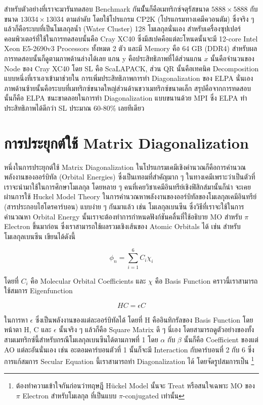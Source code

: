สำหรับตัวอย่างที่เราจะมารันทดสอบ Benchmark กันนัั้นก็คือเมทริกซ์จตุรัสขนาด $5888 \times 5888$ กับขนาด $13034 \times 13034$
ตามลำดับ โดยใช้โปรแกรม CP2K (โปรแกรมทางเคมีควอนตัม) ซึ่งจริง ๆ แล้วก็คือระบบที่เป็นโมเลกุลน้ำ (Water Cluster) 128 โมเลกุลนั่นเอง
สำหรับเครื่องซุปเปอร์คอมพิวเตอร์ที่ใช้ในการทดสอบนั้นคือ Cray XC40 ซึ่งมีสเปคคือแต่ละโหนดนั้นจะมี 12-core Intel Xeon E5-2690v3 Processors
ทั้งหมด 2 ตัว และมี Memory คือ 64 GB (DDR4) สำหรับผลการทดสอบนั้นก็ดูตามภาพด้านล่างได้เลย แกน y คือประสิทธิภาพที่ได้ส่วนแกน $x$
นั้นคือจำนวนของ Node ของ Cray XC40 โดย SL คือ ScaLAPACK, ส่วน QR นั้นคือเทคนิค Decomposition แบบหนึ่งที่เราเอาเข้ามาช่วยใน%
การเพิ่มประสิทธิภาพการทำ Diagonalization ของ ELPA นั่นเอง ภาพด้านซ้ายนั้นคือระบบที่เมทริกซ์ขนาดใหญ่ส่วนด้านขวาเมทริกซ์ขนาดเล็ก
สรุปคือจากการทดสอบนั้นก็คือ ELPA ชนะขาดลอยในการทำ Diagonalization แบบขนานด้วย MPI ซึ่ง ELPA ทำประสิทธิภาพได้ดีกว่า SL
ประมาณ 60-80\% เลยทีเดียว

\section{การประยุกต์ใช้ Matrix Diagonalization}

หนึ่งในการประยุกต์ใช้ Matrix Diagonalization ในโปรแกรมเคมีเชิงคำนวณก็คือการคำนวณพลังงานของออร์บิทัล (Orbital Energies)
ซึ่งเป็นเทอมที่สำคัญมาก ๆ ในทางเคมีเพราะว่าเป็นตัวที่เราจะนำมาใช้ในการศึกษาโมเลกุล โดยหลาย ๆ คนที่เคยวิชาเคมีอินทรีย์เชิงฟิสิกส์มานั้นก็น่า%
จะเคยผ่านการใช้ Huckel Model Theory ในการคำนวณหาพลังงานของออร์บิทัลของโมเลกุลเคมีอินทรีย์ (สารประกอบไฮโดรคาร์บอน) แบบง่าย ๆ
กันมาแล้ว เช่น โมเลกุลเบนซีน ซึ่งวิธีที่เราจะใช้ในการคำนวณหา Orbital Energy นั้นเราจะต้องทำการกำหนดฟังก์ชันคลื่นที่ใช้อธิบาย MO สำหรับ
$\pi$ Electron ขึ้นมาก่อน ซึ่งเราสามารถใช้ผลรวมเชิงเส้นของ Atomic Orbitals ได้ เช่น สำหรับโมเลกุลเบนซีน เขียนได้ดังนี้

\begin{equation}
  \phi_{n} = \sum_{i=1}^{6} C_{i} \chi_{i}
\end{equation}

โดยที่ $C_{i}$ คือ Molecular Orbital Coefficients และ $\chi$ คือ Basis Function คราวนี้เราสามารถใช้สมการ Eigenfunction

\begin{equation}
  HC = \epsilon C
\end{equation}

\noindent ในการหา $\epsilon$ ซึ่งเป็นพลังงานของแต่ละออร์บิทัลได้ โดยที่ H คืออินทิกรัลของ Basis Function โดยหน้าตา H, C และ
$\epsilon$ นั้นจริง ๆ แล้วก็คือ Square Matrix ดี ๆ นี่เอง โดยสามารถดูตัวอย่างของทั้งสามเมทริกซ์นี้สำหรับกรณีโมเลกุลเบนซีนได้ตามภาพที่ 1
โดย $\alpha$ กับ $\beta$ นั้นก็คือ Coefficient ของแต่ AO แต่ละอันนั่นเอง เช่น อะตอมคาร์บอนตัวที่ 1 นั้นก็จะมี Interaction
กับคาร์บอนที่ 2 กับ 6 ซึ่งการแก้สมการ Secular Equation นี้เราสามารถทำ Diagonalization ได้ โดยจัดรูปสมการเป็น%
\footnote{ต้องทำความเข้าใจกันก่อนว่าทฤษฎี H\"{u}ckel Model นั้นจะ Treat หรือสนใจเฉพาะ MO ของ $\pi$ Electron สำหรับโมเลกุล%
ที่เป็นแบบ $\pi$-conjugated เท่านั้น}

